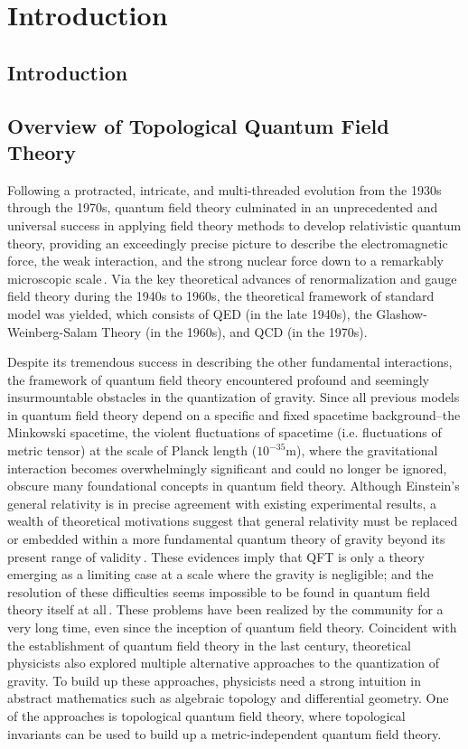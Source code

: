 \section{Introduction}\label{sec: Introduction}
\subsection{Introduction}  %


\subsection{Overview of Topological Quantum Field Theory}\label{subsec: Overview TQFT} %
\par Following a protracted, intricate, and multi-threaded evolution from the 1930s through the 1970s, quantum field theory culminated in an unprecedented and universal success in applying field theory methods to develop relativistic quantum theory, providing an exceedingly precise picture to describe the electromagnetic force, the weak interaction, and the strong nuclear force down to a remarkably microscopic scale\,\cite{wilczek1999}. Via the key theoretical advances of renormalization and gauge field theory during the 1940s to 1960s, the theoretical framework of standard model was yielded, which consists of QED (in the late 1940s), the Glashow-Weinberg-Salam Theory (in the 1960s), and QCD (in the 1970s). \par Despite its tremendous success in describing the other fundamental interactions, the framework of quantum field theory encountered profound and seemingly insurmountable obstacles in the quantization of gravity. Since all previous models in quantum field theory depend on a specific and fixed spacetime background--the Minkowski spacetime, the violent fluctuations of spacetime (i.e.  fluctuations of metric tensor) at the scale of Planck length ($10^{-35}$m), where the gravitational interaction becomes overwhelmingly significant and could no longer be ignored, obscure many foundational concepts in quantum field theory. Although Einstein's general relativity is in precise agreement with existing experimental results, a wealth of theoretical motivations suggest that general relativity must be replaced or embedded within a more fundamental quantum theory of gravity beyond its present range of validity\,\cite{keifer2006}. These evidences imply that QFT is only a theory emerging as a limiting case at a scale where the gravity is negligible; and the resolution of these difficulties seems impossible to be found in quantum field theory itself at all\,\cite{gross1999}. These problems have been realized by the community for a very long time, even since the inception of quantum field theory. Coincident with the establishment of quantum field theory in the last century, theoretical physicists also explored multiple alternative approaches to the quantization of gravity. To build up these approaches, physicists need a strong intuition in abstract mathematics such as algebraic topology and differential geometry. One of the approaches is topological quantum field theory, where topological invariants can be used to build up a metric-independent quantum field theory.
